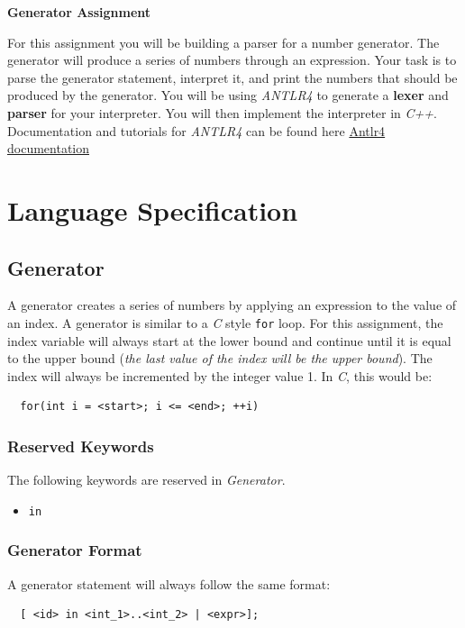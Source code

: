 \documentclass{article}
\newcommand{\code}[1]{\texttt{\textmd{#1}}}
\begin{document}
\ifpdf
  \LARGE
  \textbf{Generator Assignment}
  \normalsize
\fi

For this assignment you will be building a parser for a number generator. The generator will
produce a series of numbers through an expression. Your task is to parse the generator statement,
interpret it, and print the numbers that should be produced by the generator. You will be using
\textit{ANTLR4} to generate a \textbf{lexer} and \textbf{parser} for your interpreter. You will
then implement the interpreter in \textit{C++}. Documentation and tutorials for \textit{ANTLR4} can
be found here \href{https://github.com/antlr/antlr4/blob/master/doc/index.md}
{Antlr4 documentation}

\section{Language Specification}
\subsection{Generator}
A generator creates a series of numbers by applying an expression to the value of an index. A
generator is similar to a \textit{C} style \code{for} loop. For this assignment, the index variable
will always start at the lower bound and continue until it is equal to the upper bound (\textit{the
last value of the index will be the upper bound}). The index will always be incremented by the
integer value 1. In \textit{C}, this would be:
\begin{lstlisting}
  for(int i = <start>; i <= <end>; ++i)
\end{lstlisting}

\subsubsection{Reserved Keywords}
The following keywords are reserved in \textit{Generator}.
\begin{itemize}
  \item \code{in}
\end{itemize}

\subsubsection{Generator Format}
A generator statement will always follow the same format:
\begin{lstlisting}
  [ <id> in <int_1>..<int_2> | <expr>];
\end{lstlisting}
\end{document}
